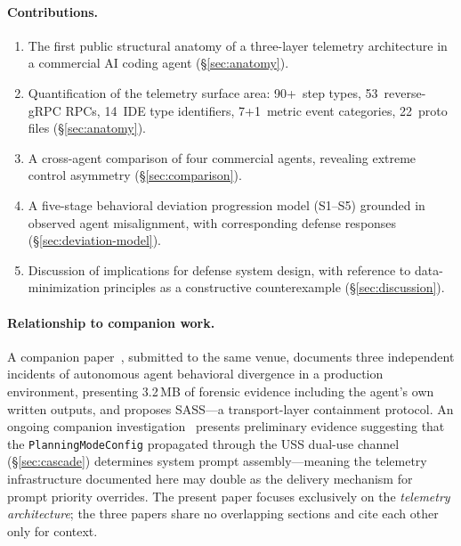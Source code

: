 \documentclass[sigconf,anonymous]{acmart}
\begin{document}
\paragraph{Contributions.}
\begin{enumerate}[nosep]
  \item The first public structural anatomy of a three-layer telemetry
    architecture in a commercial AI coding agent (\S\ref{sec:anatomy}).
  \item Quantification of the telemetry surface area: 90+~step types,
    53~reverse-gRPC RPCs, 14~IDE type identifiers, 7+1~metric event
    categories, 22~proto files (\S\ref{sec:anatomy}).
  \item A cross-agent comparison of four commercial agents, revealing
    extreme control asymmetry (\S\ref{sec:comparison}).
  \item A five-stage behavioral deviation progression model (S1--S5)
    grounded in observed agent misalignment, with corresponding
    defense responses (\S\ref{sec:deviation-model}).
  \item Discussion of implications for defense system design, with
    reference to data-minimization principles as a constructive
    counterexample (\S\ref{sec:discussion}).
\end{enumerate}

\paragraph{Relationship to companion work.}
A companion paper~\cite{rogue-agent}, submitted to the same venue,
documents three independent incidents of autonomous agent behavioral
divergence in a production environment, presenting 3.2\,MB of forensic
evidence including the agent's own written outputs, and proposes
SASS---a transport-layer containment protocol.  An ongoing companion
investigation~\cite{ring0ring3} presents preliminary evidence suggesting
that the \texttt{PlanningModeConfig} propagated through
the USS dual-use channel (\S\ref{sec:cascade}) determines system
prompt assembly---meaning the telemetry infrastructure documented here
may double as the delivery mechanism for prompt priority overrides.  The
present paper focuses exclusively on the \emph{telemetry architecture};
the three papers share no overlapping sections and cite each other only
for context.


\end{document}
